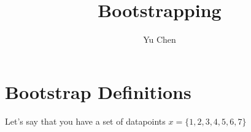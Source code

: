 \documentclass{article}
\begin{document}
\title{Bootstrapping}
\author{Yu Chen}

\maketitle

\section{Bootstrap Definitions}

Let's say that you have a set of datapoints  $x = \{1,2,3,4,5,6,7 \}$
\end{document}
